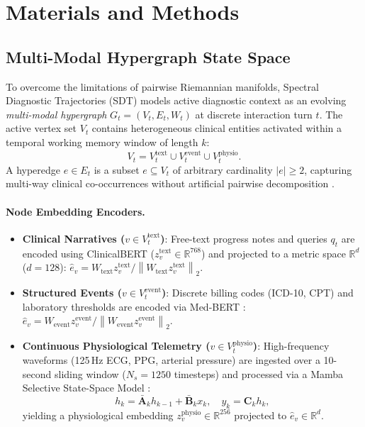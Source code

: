 \documentclass[12pt]{article}
\newcommand{\R}{\mathbb{R}}
\newcommand{\norm}[1]{\left\lVert#1\right\rVert}
\begin{document}
\section*{Materials and Methods}

\subsection*{Multi-Modal Hypergraph State Space}

To overcome the limitations of pairwise Riemannian manifolds, Spectral Diagnostic Trajectories (SDT) models active diagnostic context as an evolving \emph{multi-modal hypergraph} $G_t = (V_t, E_t, W_t)$ at discrete interaction turn $t$. The active vertex set $V_t$ contains heterogeneous clinical entities activated within a temporal working memory window of length $k$:
\begin{equation}
  V_t = V_t^{\text{text}} \cup V_t^{\text{event}} \cup V_t^{\text{physio}}.
  \label{eq:node_partition}
\end{equation}
A hyperedge $e \in E_t$ is a subset $e \subseteq V_t$ of arbitrary cardinality $|e| \ge 2$, capturing multi-way clinical co-occurrences without artificial pairwise decomposition \cite{zhou2006learning}.

\paragraph{Node Embedding Encoders.}
\begin{itemize}
  \item \textbf{Clinical Narratives ($v \in V_t^{\text{text}}$)}: Free-text progress notes and queries $q_t$ are encoded using ClinicalBERT \cite{huang2019clinicalbert,alsentzer2019publicly} ($z_v^{\text{text}} \in \R^{768}$) and projected to a metric space $\R^d$ ($d=128$): $\hat{e}_v = W_{\text{text}} z_v^{\text{text}} / \norm{W_{\text{text}} z_v^{\text{text}}}_2$.
  \item \textbf{Structured Events ($v \in V_t^{\text{event}}$)}: Discrete billing codes (ICD-10, CPT) and laboratory thresholds are encoded via Med-BERT \cite{rasmy2021medbert}: $\hat{e}_v = W_{\text{event}} z_v^{\text{event}} / \norm{W_{\text{event}} z_v^{\text{event}}}_2$.
  \item \textbf{Continuous Physiological Telemetry ($v \in V_t^{\text{physio}}$)}: High-frequency waveforms (125\,Hz ECG, PPG, arterial pressure) are ingested over a 10-second sliding window ($N_s = 1250$ timesteps) and processed via a Mamba Selective State-Space Model \cite{gu2023mamba}:
  \begin{equation}
    h_k = \bar{\bm{A}}_k h_{k-1} + \bar{\bm{B}}_k x_k, \quad y_k = \bm{C}_k h_k,
  \end{equation}
  yielding a physiological embedding $z_v^{\text{physio}} \in \R^{256}$ projected to $\hat{e}_v \in \R^d$.
\end{itemize}
\end{document}

